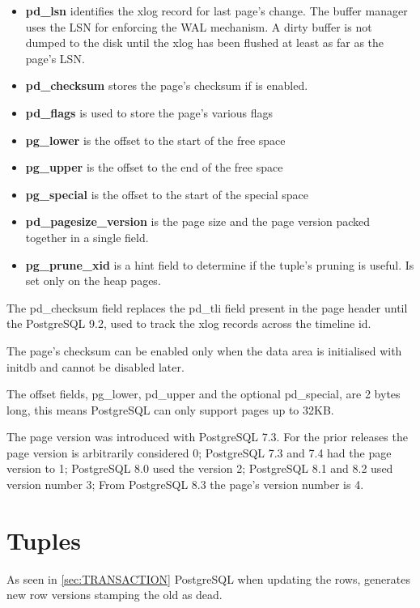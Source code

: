 \begin{itemize}
 \item \textbf{pd\_lsn} identifies the xlog record for last page's change.  The 
buffer manager uses the  LSN for enforcing the WAL mechanism. A dirty buffer is not 
dumped to the disk until the xlog has been flushed at least as far as the page's LSN.
\item \textbf{pd\_checksum} stores the page's checksum if is enabled.
\item \textbf{pd\_flags} is used to store the page's various flags 
\item \textbf{pg\_lower} is the offset to the start of the free space
\item \textbf{pg\_upper} is the offset to the end of the free space
\item \textbf{pg\_special} is the offset to the start of the special space
\item \textbf{pd\_pagesize\_version} is the page size and the page version packed 
together in a single field. 
\item \textbf{pg\_prune\_xid} is a hint field to determine if the tuple's pruning is 
useful. Is set only on the heap pages.

\end{itemize}

The pd\_checksum field replaces the pd\_tli field present in the page 
header until the PostgreSQL 9.2, used to track the xlog records across the timeline id. 
\newline 

The page's checksum can be enabled only when the data area is initialised with 
initdb and cannot be disabled later.\newline

The offset fields, pg\_lower, pd\_upper and the optional pd\_special, are 2 
bytes long, this means PostgreSQL can only support pages up to 32KB.\newline

The page version was introduced with PostgreSQL 7.3. 
For the prior releases the page version is arbitrarily considered 0; PostgreSQL 
7.3 and 7.4 had the page version to 1; PostgreSQL 8.0 used the version 2; 
PostgreSQL 8.1 and 8.2 used version number 3; From PostgreSQL 8.3 the page's 
version number is 4.

\section{Tuples}
\label{sec:TUPLES}
As seen in \ref{sec:TRANSACTION} PostgreSQL when updating the rows, generates 
new row versions stamping the old as dead. \newline

